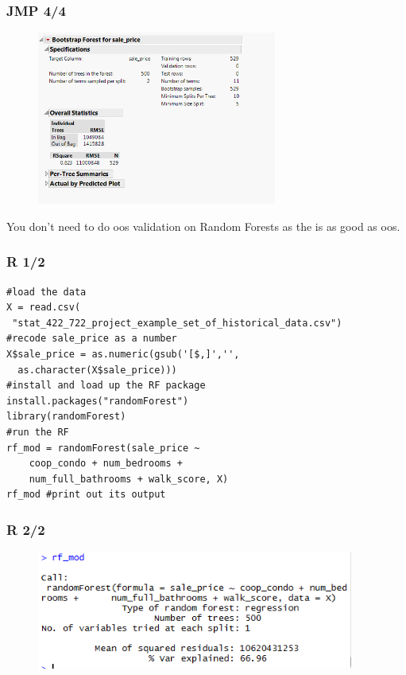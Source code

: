 \documentclass[handout]{beamer}
\begin{document}
\begin{frame}\frametitle{JMP 4/4}

\begin{figure}
\centering
\includegraphics[width=3.1in]{jmp04.png}
\end{figure}
You don't need to do oos validation on Random Forests as the  is as good as oos.
\end{frame}

\begin{frame}[fragile]\frametitle{R 1/2}

\begin{verbatim}
#load the data
X = read.csv(
 "stat_422_722_project_example_set_of_historical_data.csv")
#recode sale_price as a number
X$sale_price = as.numeric(gsub('[$,]','',
  as.character(X$sale_price)))
#install and load up the RF package
install.packages("randomForest")
library(randomForest)
#run the RF
rf_mod = randomForest(sale_price ~ 
	coop_condo + num_bedrooms + 
	num_full_bathrooms + walk_score, X)
rf_mod #print out its output
\end{verbatim}


\end{frame}

\begin{frame}\frametitle{R 2/2}

\begin{figure}
\centering
\includegraphics[width=4.1in]{R01.png}
\end{figure}

\end{frame}
\end{document}
